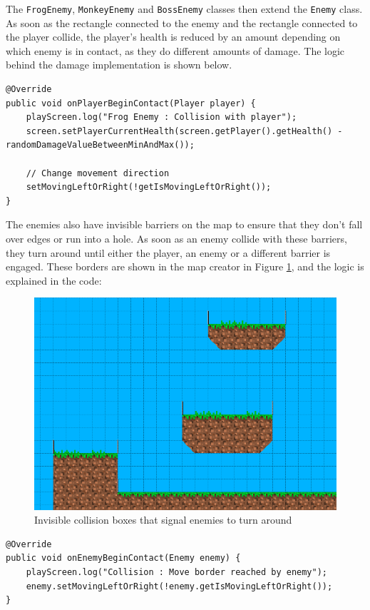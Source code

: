 \documentclass[12p]{article}
\begin{document}
The \texttt{FrogEnemy}, \texttt{MonkeyEnemy} and \texttt{BossEnemy} classes then extend the \texttt{Enemy} class. As soon as the rectangle connected to the enemy and the rectangle connected to the player collide, the player’s health is reduced by an amount depending on which enemy is in contact, as they do different amounts of damage. The logic behind the damage implementation is shown below.

\begin{verbatim}
@Override
public void onPlayerBeginContact(Player player) {
    playScreen.log("Frog Enemy : Collision with player");
    screen.setPlayerCurrentHealth(screen.getPlayer().getHealth() - randomDamageValueBetweenMinAndMax());

    // Change movement direction
    setMovingLeftOrRight(!getIsMovingLeftOrRight());
}
\end{verbatim}

The enemies also have invisible barriers on the map to ensure that they don’t fall over edges or run into a hole. As soon as an enemy collide with these barriers, they turn around until either the player, an enemy or a different barrier is engaged. These borders are shown in the map creator in Figure \ref{fig:EnemyMoveBorders}, and the logic is explained in the code:

\begin{figure}[ht]
  \center
  \includegraphics[width=1\textwidth]{Documentation/enemyMoveBorders}
  \caption{Invisible collision boxes that signal enemies to turn around}
  \label{fig:EnemyMoveBorders}
\end{figure}

\begin{verbatim}
@Override
public void onEnemyBeginContact(Enemy enemy) {
    playScreen.log("Collision : Move border reached by enemy");
    enemy.setMovingLeftOrRight(!enemy.getIsMovingLeftOrRight());
}
\end{verbatim}
\end{document}
